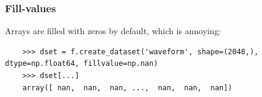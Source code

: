 \documentclass[9pt]{beamer}
\begin{document}
\begin{frame}[fragile]
  \frametitle{Fill-values}
  Arrays are filled with zeros by default, which is annoying:
  \begin{verbatim}
    >>> dset = f.create_dataset('waveform', shape=(2048,), dtype=np.float64, fillvalue=np.nan)
    >>> dset[...]
    array([ nan,  nan,  nan, ...,  nan,  nan,  nan])
  \end{verbatim}
\end{frame}
\end{document}
